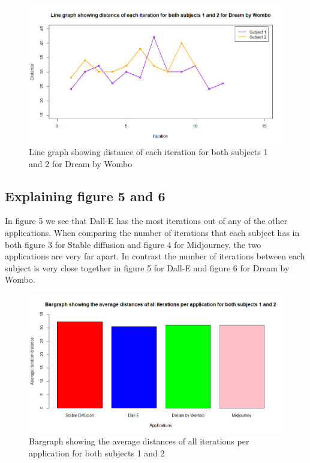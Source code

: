 \documentclass[]{report}
\begin{document}
	\begin{figure}[!htbp]
		\centering
		\includegraphics[width=1\linewidth, trim=0 0 0 50, clip]{LineGraphDBW}
		\caption{Line graph showing distance of each iteration for both subjects 1 and 2 for Dream by Wombo}
		\label{fig:linegraphdbw}
	\end{figure}
	
	\pagebreak
	\subsection{Explaining figure 5 and 6}
	
	In figure 5 we see that Dall-E has the most iterations out of any of the other applications. When comparing the number of iterations that each subject has in both figure 3 for Stable diffusion and figure 4 for Midjourney, the two applications are very far apart. In contrast the number of iterations between each subject is very close together in figure 5 for Dall-E and figure 6 for Dream by Wombo.
	
	
	
	\begin{figure}[!htbp]
		\centering
		\includegraphics[width=1\linewidth, trim=0 0 0 50, clip]{Bargraph}
		\caption{Bargraph showing the average distances of all iterations per application for both subjects 1 and 2}
		\label{fig:bargraph}
	\end{figure}
	
\end{document}

